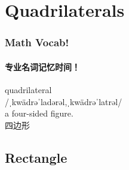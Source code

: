 \documentclass[
	11pt, %
]{beamer}
\begin{document}


\section{Quadrilaterals}


\begin{frame}
	\frametitle{Math Vocab!} %
	\framesubtitle{专业名词记忆时间！}
	
	{\Huge quadrilateral}\\
	{\LARGE /ˌkwädrəˈladərəl,ˌkwädrəˈlatrəl/\\
		\bigskip\bigskip
	a four-sided figure. \\ 
	四边形}

\end{frame}


\subsection{Rectangle}

\end{document}
